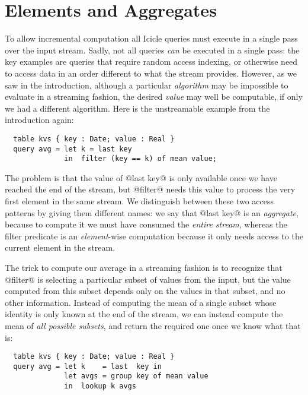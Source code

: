 
\section{Elements and Aggregates}
\label{icicle:s:ElementsAndAggregates}
To allow incremental computation all Icicle queries must execute in a single pass over the input stream.
Sadly, not all queries \emph{can} be executed in a single pass: the key examples are queries that require random access indexing, or otherwise need to access data in an order different to what the stream provides.
However, as we saw in the introduction, although a particular \emph{algorithm} may be impossible to evaluate in a streaming fashion, the desired \emph{value} may well be computable, if only we had a different algorithm.
Here is the unstreamable example from the introduction again:
\begin{lstlisting}
  table kvs { key : Date; value : Real }
  query avg = let k = last key
              in  filter (key == k) of mean value;
\end{lstlisting}

The problem is that the value of @last key@ is only available once we have reached the end of the stream, but @filter@ needs this value to process the very first element in the same stream.
We distinguish between these two access patterns by giving them different names: we say that @last key@ is an \emph{aggregate}, because to compute it we must have consumed the \emph{entire stream}, whereas the filter predicate is an \emph{element}-wise computation because it only needs access to the current element in the stream.

The trick to compute our average in a streaming fashion is to recognize that @filter@ is selecting a particular subset of values from the input, but the value computed from this subset depends only on the values in that subset, and no other information. Instead of computing the mean of a single subset whose identity is only known at the end of the stream, we can instead compute the mean of \emph{all possible subsets}, and return the required one once we know what that is:
\begin{lstlisting}
  table kvs { key : Date; value : Real } 
  query avg = let k    = last  key in
              let avgs = group key of mean value
              in  lookup k avgs
\end{lstlisting}

